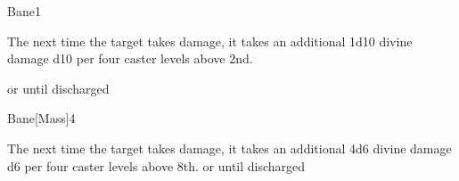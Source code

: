 \begin{spellsection}{Bane}{1}
\begin{spellheader}
\end{spellheader}
\begin{spellcontent}
    \begin{spelltargetinginfo}
    \end{spelltargetinginfo}
    \begin{spelleffects}
        \spelleffect The next time the target takes damage, it takes an additional 1d10 divine damage \add d10 per four caster levels above 2nd.

        \spelldur \durshort or until discharged \dismissable
    \end{spelleffects}
\end{spellcontent}
\begin{spellfooter}
\end{spellfooter}
\end{spellsection}

\begin{spellsection}{Bane}[Mass]{4}
\begin{spellheader}
\end{spellheader}
\begin{spellcontent}
    \begin{spelltargetinginfo}
    \end{spelltargetinginfo}
    \begin{spelleffects}
        \spelleffect The next time the target takes damage, it takes an additional 4d6 divine damage \add d6 per four caster levels above 8th.
        \spelldur \durshort or until discharged \dismissable
    \end{spelleffects}
\end{spellcontent}
\begin{spellfooter}
\end{spellfooter}
\end{spellsection}

